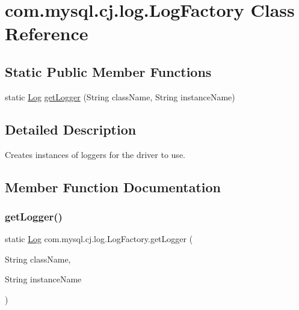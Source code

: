 \hypertarget{classcom_1_1mysql_1_1cj_1_1log_1_1_log_factory}{}\section{com.\+mysql.\+cj.\+log.\+Log\+Factory Class Reference}
\label{classcom_1_1mysql_1_1cj_1_1log_1_1_log_factory}
\subsection*{Static Public Member Functions}
\begin{DoxyCompactItemize}
\item 
static \mbox{\hyperlink{interfacecom_1_1mysql_1_1cj_1_1log_1_1_log}{Log}} \mbox{\hyperlink{classcom_1_1mysql_1_1cj_1_1log_1_1_log_factory_a5d393f9de68c04d12ff8d6d140203e8c}{get\+Logger}} (String class\+Name, String instance\+Name)
\end{DoxyCompactItemize}


\subsection{Detailed Description}
Creates instances of loggers for the driver to use. 

\subsection{Member Function Documentation}
\mbox{\label{classcom_1_1mysql_1_1cj_1_1log_1_1_log_factory_a5d393f9de68c04d12ff8d6d140203e8c}} 
\subsubsection{\texorpdfstring{get\+Logger()}{getLogger()}}
{\footnotesize\ttfamily static \mbox{\hyperlink{interfacecom_1_1mysql_1_1cj_1_1log_1_1_log}{Log}} com.\+mysql.\+cj.\+log.\+Log\+Factory.\+get\+Logger (\begin{DoxyParamCaption}\item[{String}]{class\+Name,  }\item[{String}]{instance\+Name }\end{DoxyParamCaption})\hspace{0.3cm}{\ttfamily [static]}}

